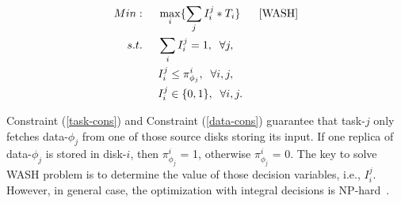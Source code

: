 \documentclass[conference]{IEEEtran}
\begin{document}
\vspace{-0.5cm}
\begin{align}
Min:&\;\;\;\;\;\max\limits_{i}\{\sum_{j}I_i^j*T_i\}\;\;\;\;\;\;[\rm{WASH}]\nonumber\\
s.t. 
&\;\;\;\;\;\sum_{i}I_i^j = 1,\;\;\forall j,\label{task-cons}\\
&\;\;\;\;\;I_i^j \leq \pi_{\phi_j}^{i},\;\;\forall i,j\label{data-cons},\\
&\;\;\;\;\;I_i^j\in\{0,1\},\;\;\forall i,j.\label{def-cons}
\end{align}

Constraint (\ref{task-cons}) and Constraint (\ref{data-cons}) guarantee that task-$j$ only fetches data-$\phi_j$ from one of those source disks storing its input. 
If one replica of data-$\phi_j$ is stored in disk-$i$, then $\pi_{\phi_j}^{i}$ = 1, otherwise $\pi_{\phi_j}^{i}$ = 0. 
The key to solve WASH problem is to determine the value of those decision variables, i.e., $I_i^j$. However, in general case, the optimization with integral decisions is NP-hard~\cite{b9}.



\end{document}
